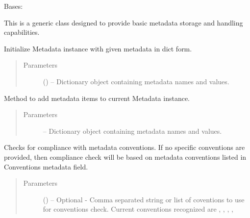 \documentclass[a4paper,10pt,openany,english]{sphinxmanual}
\begin{document}
\begin{fulllineitems}
\label{egadsapi:egads.core.metadata.Metadata}
Bases: 

This is a generic class designed to provide basic metadata storage and handling
capabilities.

Initialize Metadata instance with given metadata in dict form.
\begin{quote}\begin{description}
\item[{Parameters}] \leavevmode
{} () -- Dictionary object containing metadata names and values.

\end{description}\end{quote}

\begin{fulllineitems}
\label{egadsapi:egads.core.metadata.Metadata.add_items}
Method to add metadata items to current Metadata instance.
\begin{quote}\begin{description}
\item[{Parameters}] \leavevmode
{} -- Dictionary object containing metadata names and values.

\end{description}\end{quote}

\end{fulllineitems}


\begin{fulllineitems}
\label{egadsapi:egads.core.metadata.Metadata.compliance_check}
Checks for compliance with metadata conventions. If no specific 
conventions are provided, then compliance check will be based on 
metadata conventions listed in Conventions metadata field.
\begin{quote}\begin{description}
\item[{Parameters}] \leavevmode
{} () -- Optional - Comma separated string or list of coventions to use for 
conventions check. Current conventions recognized are , 
, , , 


\end{description}
\end{quote}
\end{fulllineitems}
\end{fulllineitems}
\end{document}
